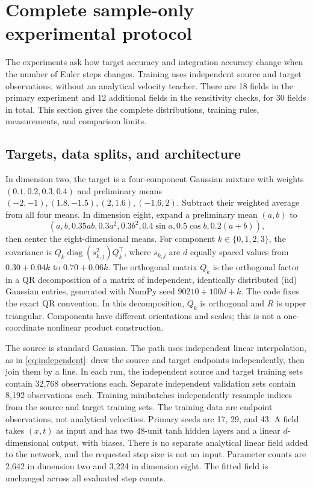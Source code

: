 \section{Complete sample-only experimental protocol}
\label{app:experiments}
The experiments ask how target accuracy and integration accuracy change
when the number of Euler steps changes. Training uses independent source
and target observations, without an analytical velocity teacher.
There are 18 fields in the primary experiment and 12 additional fields in
the sensitivity checks, for 30 fields in total. This section gives the
complete distributions, training rules, measurements, and comparison
limits.\AIassistance

\subsection{Targets, data splits, and architecture}
In dimension two, the target is a four-component Gaussian mixture with weights
$(0.1,0.2,0.3,0.4)$ and preliminary means
$(-2,-1),(1.8,-1.5),(2,1.6),(-1.6,2)$. Subtract their weighted average
from all four means. In dimension eight, expand a preliminary mean $(a,b)$ to
\[
 (a,b,0.35ab,0.3a^2,0.3b^2,0.4\sin a,0.5\cos b,0.2(a+b)),
\]
then center the eight-dimensional means. For component $k\in\{0,1,2,3\}$,
the covariance is $Q_k\operatorname{diag}(s_{k,j}^2)Q_k^\top$, where
$s_{k,j}$ are $d$ equally spaced values from $0.30+0.04k$ to
$0.70+0.06k$. The orthogonal matrix $Q_k$ is the orthogonal factor in a QR decomposition
of a matrix of independent, identically distributed (iid) Gaussian entries,
generated with NumPy seed $90210+100d+k$. The code fixes
the exact QR convention. In this decomposition, $Q_k$ is orthogonal and
$R$ is upper triangular. Components have different orientations and scales;
this is not a one-coordinate nonlinear product construction.

The source is standard Gaussian. The path uses independent linear
interpolation, as in \eqref{eq:independent}: draw the source and target
endpoints independently, then join them by a line. In each run, the
independent source and target training sets contain 32,768 observations each.
Separate independent validation sets contain 8,192 observations each.
Training minibatches independently resample indices from the source and
target training sets. The training data are endpoint observations, not analytical
velocities.
Primary seeds are 17, 29, and 43. A field takes $(x,t)$ as input and has two
48-unit tanh hidden layers and a linear $d$-dimensional output, with biases.
There is no separate analytical linear field added to the network, and
the requested step size is not an input. Parameter counts
are 2,642 in dimension two and 3,224 in dimension eight. The fitted field is unchanged across all evaluated step counts.

